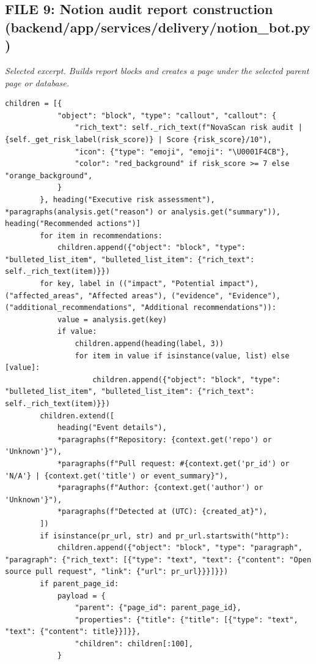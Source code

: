 \documentclass[11pt,a4paper]{article}
\begin{document}
{\subsection{FILE 9: Notion audit report construction\\(backend/app/services/delivery/notion\_bot.py)}

\textit{Selected excerpt. Builds report blocks and creates a page under the selected parent page or database.}

\begin{lstlisting}[style=python]
        children = [{
            "object": "block", "type": "callout", "callout": {
                "rich_text": self._rich_text(f"NovaScan risk audit | {self._get_risk_label(risk_score)} | Score {risk_score}/10"),
                "icon": {"type": "emoji", "emoji": "\U0001F4CB"},
                "color": "red_background" if risk_score >= 7 else "orange_background",
            }
        }, heading("Executive risk assessment"), *paragraphs(analysis.get("reason") or analysis.get("summary")), heading("Recommended actions")]
        for item in recommendations:
            children.append({"object": "block", "type": "bulleted_list_item", "bulleted_list_item": {"rich_text": self._rich_text(item)}})
        for key, label in (("impact", "Potential impact"), ("affected_areas", "Affected areas"), ("evidence", "Evidence"), ("additional_recommendations", "Additional recommendations")):
            value = analysis.get(key)
            if value:
                children.append(heading(label, 3))
                for item in value if isinstance(value, list) else [value]:
                    children.append({"object": "block", "type": "bulleted_list_item", "bulleted_list_item": {"rich_text": self._rich_text(item)}})
        children.extend([
            heading("Event details"),
            *paragraphs(f"Repository: {context.get('repo') or 'Unknown'}"),
            *paragraphs(f"Pull request: #{context.get('pr_id') or 'N/A'} | {context.get('title') or event_summary}"),
            *paragraphs(f"Author: {context.get('author') or 'Unknown'}"),
            *paragraphs(f"Detected at (UTC): {created_at}"),
        ])
        if isinstance(pr_url, str) and pr_url.startswith("http"):
            children.append({"object": "block", "type": "paragraph", "paragraph": {"rich_text": [{"type": "text", "text": {"content": "Open source pull request", "link": {"url": pr_url}}}]}})
        if parent_page_id:
            payload = {
                "parent": {"page_id": parent_page_id},
                "properties": {"title": {"title": [{"type": "text", "text": {"content": title}}]}},
                "children": children[:100],
            }
\end{lstlisting}

}
\end{document}
